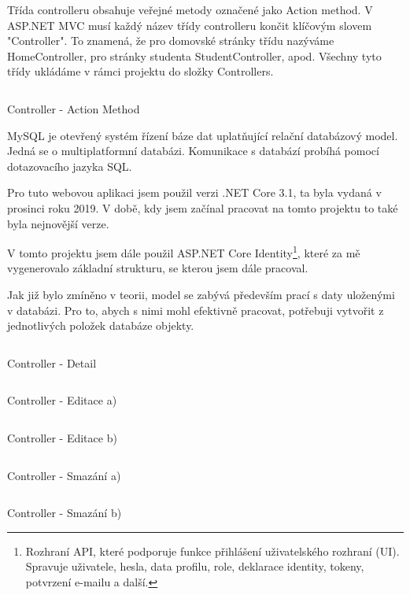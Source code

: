 \documentclass[a4paper, 12pt]{report}
\begin{document}
				Třída controlleru obsahuje veřejné metody označené jako Action method. V ASP.NET MVC musí každý název třídy controlleru končit klíčovým slovem "Controller". To znamená, že pro domovské stránky třídu nazýváme HomeController, pro stránky studenta StudentController, apod. Všechny tyto třídy ukládáme v rámci projektu do složky Controllers.
	\begin{listing}[H]
	\inputminted{csharp}{SourceCode/ActionMethod.cs}
	\caption{Controller - Action Method}
	\label{ActionMethod}
	\end{listing}
	MySQL je otevřený systém řízení báze dat uplatňující relační databázový model. Jedná se o multiplatformní databázi. Komunikace s databází probíhá pomocí dotazovacího jazyka SQL.\cite{MySQL_Wiki_CZ}

	Pro tuto webovou aplikaci jsem použil verzi .NET Core 3.1, ta byla vydaná v prosinci roku 2019. V době, kdy jsem začínal pracovat na tomto projektu to také byla nejnovější verze.\par
	V tomto projektu jsem dále použil ASP.NET Core Identity\footnote{Rozhraní API, které podporuje funkce přihlášení uživatelského rozhraní (UI). Spravuje uživatele, hesla, data profilu, role, deklarace identity, tokeny, potvrzení e-mailu a další.\cite{ASP.NET_Core_Identity}}, které za mě vygenerovalo základní strukturu, se kterou jsem dále pracoval. \par
	Jak již bylo zmíněno v teorii, model se zabývá především prací s daty uloženými v databázi. Pro to, abych s nimi mohl efektivně pracovat, potřebuji vytvořit z jednotlivých položek databáze objekty.
	\begin{listing}[H]
	\inputminted{csharp}{SourceCode/Detail.cs}
	\caption{Controller - Detail}
	\label{Detail}
	\end{listing}
	\begin{listing}[H]
	\inputminted{csharp}{SourceCode/Edit.cs}
	\caption{Controller - Editace a)}
	\label{Edit}
	\end{listing}

	\begin{listing}[H]
	\inputminted{csharp}{SourceCode/Edit_Post.cs}
	\caption{Controller - Editace b)}
	\label{Edit_Post}
	\end{listing}
	\begin{listing}[H]
	\inputminted{csharp}{SourceCode/Delete.cs}
	\caption{Controller - Smazání a)}
	\label{Delete}
	\end{listing}
	\begin{listing}[H]
	\inputminted{csharp}{SourceCode/Delete_Post.cs}
	\caption{Controller - Smazání b)}
	\label{Delete_Post}
	\end{listing}

	\seznamTabulek
	
	\seznamObrazku

	\renewcommand\listoflistingscaption{Seznam zdrojových kódů}
	\listoflistings
	

	
	

\end{document}
